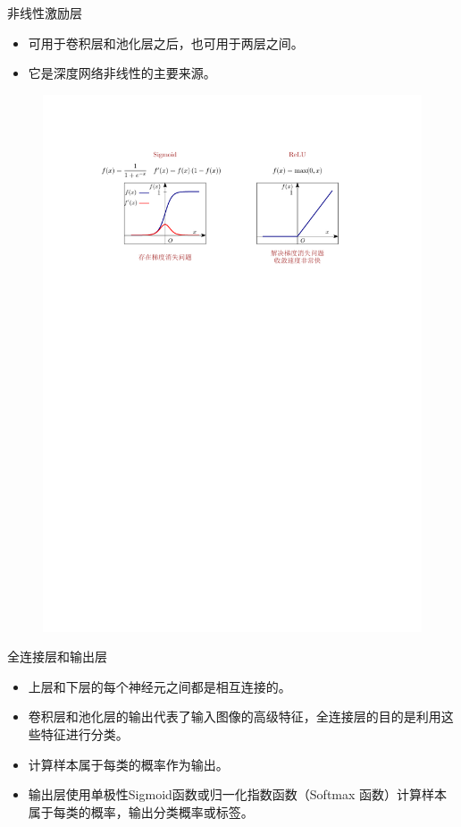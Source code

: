 \begin{note}
    非线性激励层
    \begin{itemize}
        \item 可用于卷积层和池化层之后，也可用于两层之间。
        \item 它是深度网络非线性的主要来源。
    \end{itemize}
    \begin{figure}[htbp]
        \centering
        \includegraphics{image/非线性激励层.pdf}
    \end{figure}
\end{note}
\begin{note}
    全连接层和输出层
    \begin{itemize}
        \item 上层和下层的每个神经元之间都是相互连接的。
        \item 卷积层和池化层的输出代表了输入图像的高级特征，全连接层的目的是利用这些特征进行分类。
        \item 计算样本属于每类的概率作为输出。
        \item 输出层使用单极性Sigmoid函数或归一化指数函数（Softmax 函数）计算样本属于每类的概率，输出分类概率或标签。
    \end{itemize}
\end{note}
